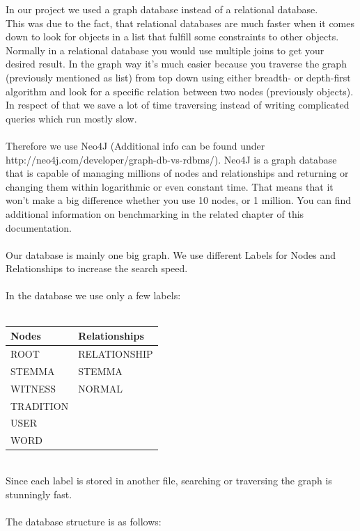 \documentclass[11pt,fleqn,openany]{book} %
\begin{document}
In our project we used a graph database instead of a relational database.\\ This was due to the fact, that relational databases are much faster when it comes down to look for objects in a list that fulfill some constraints to other objects. Normally in a relational database you would use multiple joins to get your desired result. In the graph way it’s much easier because you traverse the graph (previously mentioned as list) from top down using either breadth- or depth-first algorithm and look for a specific relation between two nodes (previously objects). In respect of that we save a lot of time traversing instead of writing complicated queries which run mostly slow. \\ \quad \\Therefore we use Neo4J (Additional info can be found under http://neo4j.com/developer/graph-db-vs-rdbms/). Neo4J is a graph database that is capable of managing millions of nodes and relationships and returning or changing them within logarithmic or even constant time. That means that it won’t make a big difference whether you use 10 nodes, or 1 million. You can find additional information on benchmarking in the related chapter of this documentation. \\ \quad \\Our database is mainly one big graph. We use different Labels for Nodes and Relationships to increase the search speed. \\ \quad \\ In the database we use only a few labels:\\ \quad \\
\begin{tabular}{|l|l|}
\hline 
\textbf{Nodes} & \textbf{Relationships} \\ 
\hline 
ROOT & RELATIONSHIP \\ 
\hline 
STEMMA & STEMMA \\ 
\hline 
WITNESS & NORMAL \\ 
\hline 
TRADITION &  \\ 
\hline 
USER &  \\ 
\hline 
WORD &  \\ 
\hline 
\end{tabular} \\
Since each label is stored in another file, searching or traversing the graph is stunningly fast. \\ \quad \\ The database structure is as follows:
\end{document}

